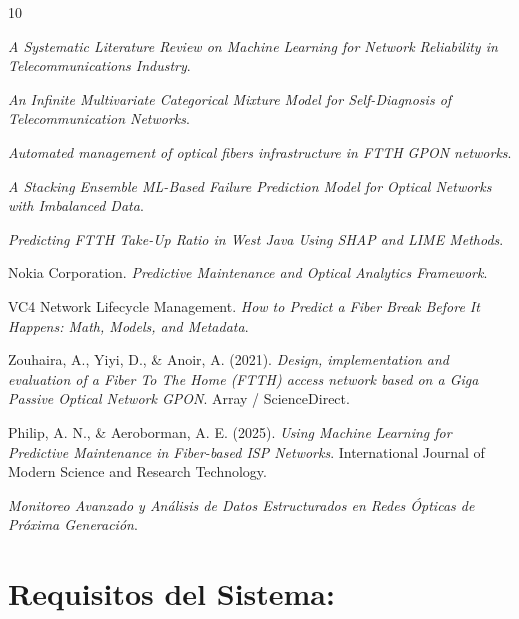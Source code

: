 \documentclass[12pt,a4paper]{article}
\begin{document}
\begin{thebibliography}{10}

  \textit{A Systematic Literature Review on Machine Learning for Network Reliability in Telecommunications Industry}. 

  \textit{An Infinite Multivariate Categorical Mixture Model for Self-Diagnosis of Telecommunication Networks}. 

  \textit{Automated management of optical fibers infrastructure in FTTH GPON networks}. 

  \textit{A Stacking Ensemble ML-Based Failure Prediction Model for Optical Networks with Imbalanced Data}. 

  \textit{Predicting FTTH Take-Up Ratio in West Java Using SHAP and LIME Methods}. 

  Nokia Corporation. \textit{Predictive Maintenance and Optical Analytics Framework}. 

  VC4 Network Lifecycle Management. \textit{How to Predict a Fiber Break Before It Happens: Math, Models, and Metadata}. 

  Zouhaira, A., Yiyi, D., \& Anoir, A. (2021). \textit{Design, implementation and evaluation of a Fiber To The Home (FTTH) access network based on a Giga Passive Optical Network GPON}. Array / ScienceDirect.

  Philip, A. N., \& Aeroborman, A. E. (2025). \textit{Using Machine Learning for Predictive Maintenance in Fiber-based ISP Networks}. International Journal of Modern Science and Research Technology.

  \textit{Monitoreo Avanzado y Análisis de Datos Estructurados en Redes Ópticas de Próxima Generación}. 

\end{thebibliography}


 

    \section{Requisitos del Sistema:}  
\end{document}
